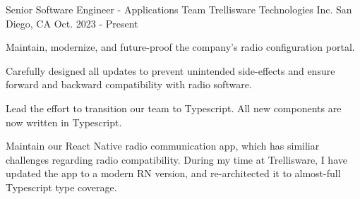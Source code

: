 

\begin{cventries}

  \cventry
    {Senior Software Engineer - Applications Team}
    {
      \hspace{0.7em}Trellisware Technologies Inc.
    }
    {San Diego, CA}
    {Oct. 2023 - Present}
    {\begin{cvitems}
      \item {
        Maintain, modernize, and future-proof the company's radio configuration portal.
      }
      \item {
        Carefully designed all updates to prevent unintended
        side-effects and ensure forward and backward compatibility with radio
        software.
      }
      \item{Lead the effort to transition our team to Typescript. All new components are now written in Typescript.}
      \item{
        Maintain our React Native radio communication app,
        which has similiar challenges regarding radio compatibility. 
        \newline
        During my time at Trellisware, I have updated the app to a modern RN
        version, and re-architected it to almost-full Typescript type coverage.
      }
    \end{cvitems}}


\end{cventries}

